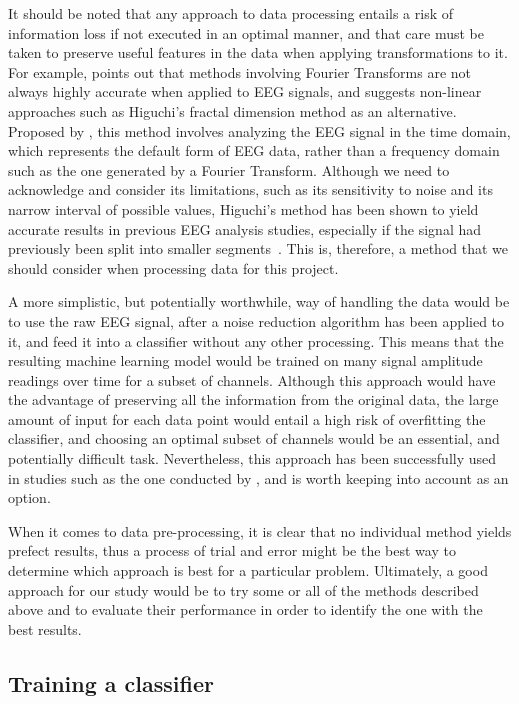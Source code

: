 \documentclass{mprop}
\begin{document}
It should be noted that any approach to data processing entails a risk of information loss if not executed in an optimal manner, and that care must be taken to preserve useful features in the data when applying transformations to it. For example, \citet{klonowski_everything_2009} points out that methods involving Fourier Transforms are not always highly accurate when applied to EEG signals, and suggests non-linear approaches such as Higuchi's fractal dimension method as an alternative. Proposed by \citet{higuchi_approach_1988}, this method involves analyzing the EEG signal in the time domain, which represents the default form of EEG data, rather than a frequency domain such as the one generated by a Fourier Transform. Although we need to acknowledge and consider its limitations, such as its sensitivity to noise and its narrow interval of possible values, Higuchi's method has been shown to yield accurate results in previous EEG analysis studies, especially if the signal had previously been split into smaller segments~\cite{kesic_application_2016}. This is, therefore, a method that we should consider when processing data for this project.

A more simplistic, but potentially worthwhile, way of handling the data would be to use the raw EEG signal, after a noise reduction algorithm has been applied to it, and feed it into a classifier without any other processing. This means that the resulting machine learning model would be trained on many signal amplitude readings over time for a subset of channels. Although this approach would have the advantage of preserving all the information from the original data, the large amount of input for each data point would entail a high risk of overfitting the classifier, and choosing an optimal subset of channels would be an essential, and potentially difficult task. Nevertheless, this approach has been successfully used in studies such as the one conducted by \citet{kaper_bci_2004}, and is worth keeping into account as an option.

When it comes to data pre-processing, it is clear that no individual method yields prefect results, thus a process of trial and error might be the best way to determine which approach is best for a particular problem. Ultimately, a good approach for our study would be to try some or all of the methods described above and to evaluate their performance in order to identify the one with the best results.
 
\subsection{Training a classifier}
\end{document}
